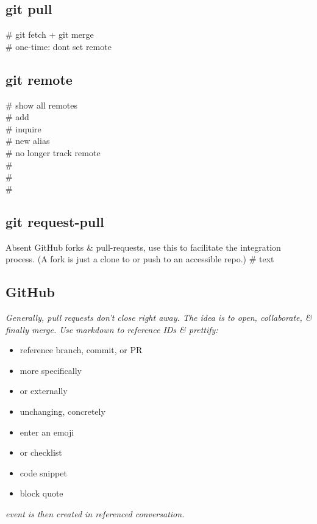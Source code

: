 \subsection*{git pull}
 \# git fetch + git merge \\
 \# one-time: don\textquotesingle t set remote


\subsection*{git remote}
 \# show all remotes \\
 \# add \\
 \# inquire \\
 \# new alias \\
 \# no longer track remote \\
 \# \\
 \# \\
 \#


\subsection*{git request-pull}
Absent GitHub forks \& pull-requests, use this to facilitate the integration process. (A fork is just a clone to or push to an accessible repo.)
 \# text

\subsection*{GitHub}
\textit{Generally, pull requests don't close right away. The idea is to open, collaborate, \& finally merge. Use markdown to reference IDs \& prettify:}
{\scriptsize
\begin{itemize}
    \item {} reference branch, commit, or PR
    \item {} more specifically
    \item {} or externally
    \item {} unchanging, concretely
    \item {} enter an emoji
    \item {} or checklist
    \item {} code snippet
    \item {} block quote
\end{itemize}}

\textit{ event is then created in referenced conversation.}

